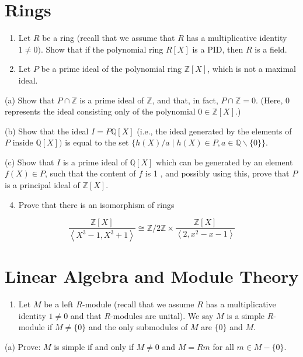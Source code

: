 \documentclass[10pt]{article}
\begin{document}
\section{Rings}
\begin{enumerate}
  \item Let $R$ be a ring (recall that we assume that $R$ has a multiplicative identity $1 \neq 0)$. Show that if the polynomial ring $R[X]$ is a $\mathrm{PID}$, then $R$ is a field.

  \item Let $P$ be a prime ideal of the polynomial ring $\mathbb{Z}[X]$, which is not a maximal ideal.

\end{enumerate}
(a) Show that $P \cap \mathbb{Z}$ is a prime ideal of $\mathbb{Z}$, and that, in fact, $P \cap \mathbb{Z}=0$. (Here, 0 represents the ideal consisting only of the polynomial $0 \in \mathbb{Z}[X]$.)

(b) Show that the ideal $I=P \mathbb{Q}[X]$ (i.e., the ideal generated by the elements of $P$ inside $\mathbb{Q}[X])$ is equal to the set $\{h(X) / a \mid h(X) \in P, a \in \mathbb{Q} \backslash\{0\}\}$.

(c) Show that $I$ is a prime ideal of $\mathbb{Q}[X]$ which can be generated by an element $f(X) \in P$, such that the content of $f$ is 1 , and possibly using this, prove that $P$ is a principal ideal of $\mathbb{Z}[X]$.

\begin{enumerate}
  \setcounter{enumi}{3}
  \item Prove that there is an isomorphism of rings
\end{enumerate}
$$
\frac{\mathbb{Z}[X]}{\left\langle X^{3}-1, X^{3}+1\right\rangle} \cong \mathbb{Z} / 2 \mathbb{Z} \times \frac{\mathbb{Z}[X]}{\left\langle 2, x^{2}-x-1\right\rangle}
$$

\section{Linear Algebra and Module Theory}
\begin{enumerate}
  \item Let $M$ be a left $R$-module (recall that we assume $R$ has a multiplicative identity $1 \neq 0$ and that $R$-modules are unital). We say $M$ is a simple $R$-module if $M \neq\{0\}$ and the only submodules of $M$ are $\{0\}$ and $M$.
\end{enumerate}
(a) Prove: $M$ is simple if and only if $M \neq 0$ and $M=R m$ for all $m \in M-\{0\}$.
\end{document}
